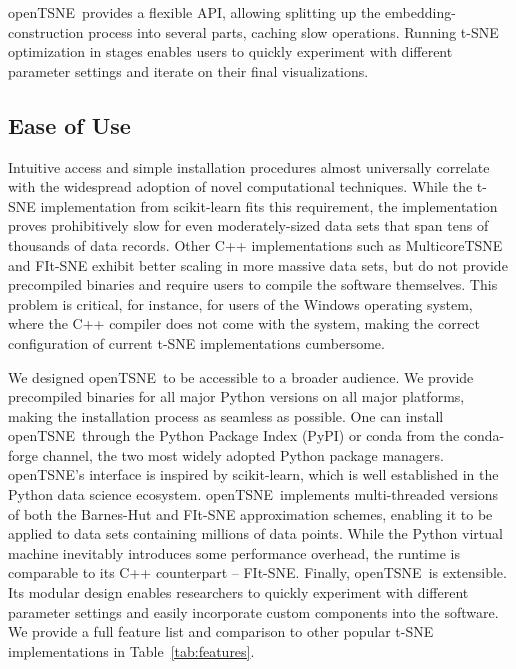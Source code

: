\documentclass[letter]{article}
\newcommand{\opentsne}{\textsf{openTSNE}}
\begin{document}
\opentsne\ provides a flexible API, allowing splitting up the
embedding-construction process into several parts, caching slow operations.
Running t-SNE optimization in stages enables users to quickly experiment with
different parameter settings and iterate on their final visualizations.

\subsection*{Ease of Use}

Intuitive access and simple installation procedures almost universally correlate
with the widespread adoption of novel computational techniques. While the t-SNE implementation
from \textsf{scikit-learn} fits this requirement, the implementation proves
prohibitively slow for even moderately-sized data sets that span tens of
thousands of data records. Other C++ implementations such as
\textsf{MulticoreTSNE} and \textsf{FIt-SNE} exhibit better scaling in more
massive data sets, but do not provide precompiled binaries and require users to
compile the software themselves. This problem is critical, for instance, for
users of the Windows operating system, where the C++ compiler does not come with the system, making
the correct configuration of current t-SNE implementations cumbersome.

We designed \opentsne\ to be accessible to a broader audience. We
provide precompiled binaries for all major Python versions on all major
platforms, making the installation process as seamless as possible. One can
install \opentsne\ through the Python Package Index (\textsf{PyPI}) or \textsf{conda} from the
\textsf{conda-forge} channel, the two most widely adopted Python package managers.
\opentsne's interface is inspired by \textsf{scikit-learn},
which is well established in the Python data science ecosystem. \opentsne\
implements multi-threaded versions of both the Barnes-Hut and FIt-SNE
approximation schemes, enabling it to be applied to data sets containing millions of data
points. While the Python virtual machine inevitably introduces some performance overhead,
the runtime is comparable to its C++ counterpart -- \textsf{FIt-SNE}. Finally,
\opentsne\ is extensible. Its modular design enables researchers to quickly
experiment with different parameter settings and easily incorporate custom components into
the software. We provide a full feature list and comparison to other popular
t-SNE implementations in Table~\ref{tab:features}.
\end{document}
